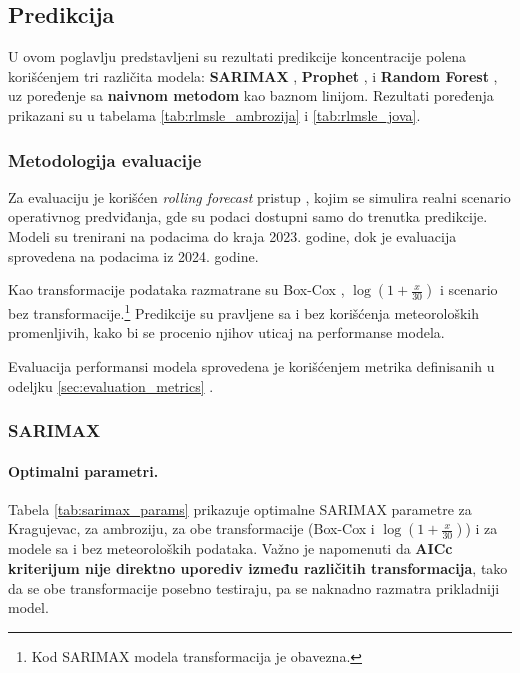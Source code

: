 \documentclass[12pt]{article}
\begin{document}
\subsection{Predikcija}

U ovom poglavlju predstavljeni su rezultati predikcije koncentracije polena korišćenjem tri različita modela: \textbf{SARIMAX} \cite{box1970, hyndman2018forecasting}, \textbf{Prophet} \cite{taylor2018}, i \textbf{Random Forest} \cite{breiman2001}, uz poređenje sa \textbf{naivnom metodom} kao baznom linijom. Rezultati poređenja prikazani su u tabelama \ref{tab:rlmsle_ambrozija} i \ref{tab:rlmsle_jova}.

\subsubsection{Metodologija evaluacije}

Za evaluaciju je korišćen \textit{rolling forecast} pristup \cite{bergmeir2012use}, kojim se simulira realni scenario operativnog predviđanja, gde su podaci dostupni samo do trenutka predikcije. Modeli su trenirani na podacima do kraja 2023. godine, dok je evaluacija sprovedena na podacima iz 2024. godine. 

Kao transformacije podataka razmatrane su Box-Cox \cite{boxcox1964}, $\operatorname{log}(1+\frac{x}{30})$ i scenario bez transformacije.\footnote{Kod SARIMAX modela transformacija je obavezna.}  
Predikcije su pravljene sa i bez korišćenja meteoroloških promenljivih, kako bi se procenio njihov uticaj na performanse modela.  

Evaluacija performansi modela sprovedena je korišćenjem metrika definisanih u odeljku \ref{sec:evaluation_metrics} \cite{brockwell2002, hyndman2018forecasting}.

\subsubsection{SARIMAX}


\paragraph{\textbf{Optimalni parametri.}}  
Tabela \ref{tab:sarimax_params} prikazuje optimalne SARIMAX parametre za Kragujevac, za ambroziju, za obe transformacije (Box-Cox i $\operatorname{log}(1+\frac{x}{30})$) i za modele sa i bez meteoroloških podataka.  
Važno je napomenuti da \textbf{AICc kriterijum nije direktno uporediv između različitih transformacija}, tako da se obe transformacije posebno testiraju, pa se naknadno razmatra  prikladniji model.  
\end{document}
